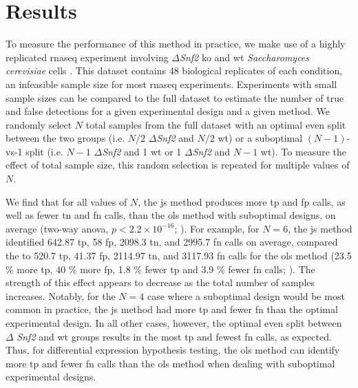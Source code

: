 \section{Results}

To measure the performance of this method in practice, we make use of a highly replicated \gls{rnaseq} experiment involving $\Delta$\emph{Snf2} \gls{ko} and \gls{wt} \emph{Saccharomyces cerevisiae} cells \cite{gierlinskiStatisticalModelsRNAseq2015}.
This dataset contains 48 biological replicates of each condition, an infeasible sample size for most \gls{rnaseq} experiments.
Experiments with small sample sizes can be compared to the full dataset to estimate the number of true and false detections for a given experimental design and a given method.
We randomly select $N$ total samples from the full dataset with an optimal even split between the two groups (i.e. $N / 2$ $\Delta$\emph{Snf2} and $N / 2$ \gls{wt}) or a suboptimal $(N - 1)$-vs-1 split (i.e. $N - 1$ $\Delta$\emph{Snf2} and 1 \gls{wt} or 1 $\Delta$\emph{Snf2} and $N - 1$ \gls{wt}).
To measure the effect of total sample size, this random selection is repeated for multiple values of $N$.

We find that for all values of $N$, the \gls{js} method produces more \gls{tp} and \gls{fp} calls, as well as fewer \gls{tn} and \gls{fn} calls, than the \gls{ols} method with suboptimal designs, on average (two-way \gls{anova}, $p < 2.2 \times 10^{-16}$; ).
For example, for $N = 6$, the \gls{js} method identified 642.87 \gls{tp}, 58 \gls{fp}, 2098.3 \gls{tn}, and 2995.7 \gls{fn} calls on average, compared the to 520.7 \gls{tp}, 41.37 \gls{fp}, 2114.97 \gls{tn}, and 3117.93 \gls{fn} calls for the \gls{ols} method (23.5 \% more \gls{tp}, 40 \% more \gls{fp}, 1.8 \% fewer \gls{tp} and 3.9 \% fewer \gls{fn} calls; ).
The strength of this effect appears to decrease as the total number of samples increases.
Notably, for the $N = 4$ case where a suboptimal design would be most common in practice, the \gls{js} method had more \gls{tp} and fewer \gls{fn} than the optimal experimental design.
In all other cases, however, the optimal even split between $\Delta $ \emph{Snf2} and \gls{wt} groups results in the most \gls{tp} and fewest \gls{fn} calls, as expected.
Thus, for differential expression hypothesis testing, the \gls{ols} method can identify more \gls{tp} and fewer \gls{fn} calls than the \gls{ols} method when dealing with suboptimal experimental designs.


